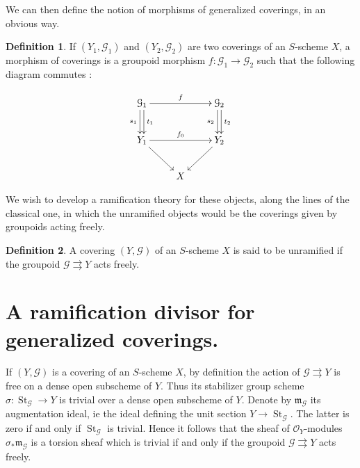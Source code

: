\documentclass{amsart}
\theoremstyle{definition}
\newtheorem{defi}{Definition}[section]
\theoremstyle{remark}
\begin{document}
We can then define the notion of morphisms of generalized coverings, in an obvious way.

\begin{defi}

If $(Y_1,{{\mathcal G}}_1)$ and $(Y_2,{{\mathcal G}}_2)$ are two coverings of an $S$-scheme $X$, a morphism of coverings is a groupoid morphism $f : {{\mathcal G}}_1 {\longrightarrow} {{\mathcal G}}_2$ such that the following diagram commutes : 

 \[ \xymatrix{ {{\mathcal G}}_1 \ar[rr]^{f} \ar@<-2pt>_{s_1}[d] \ar@<2pt>^{t_1}[d] & & {{\mathcal G}}_2 \ar@<-2pt>_{s_2}[d] \ar@<2pt>^{t_2}[d] \\  Y_1 \ar[rr]^{f_0} \ar[rd] & & Y_2 \ar[ld] \\ &  X  } \]

\end{defi}

We wish to develop a ramification theory for these objects, along the lines of the classical one, in which the unramified objects would be the coverings given by groupoids acting freely. 

\begin{defi}

A covering $(Y,{{\mathcal G}})$ of an $S$-scheme $X$ is said to be unramified if the groupoid ${{\mathcal G}} {\rightrightarrows} Y$ acts freely. 

\end{defi}

\section{A ramification divisor for generalized coverings.}

If $(Y,{{\mathcal G}})$ is a covering of an $S$-scheme $X$, by definition the action of ${{\mathcal G}} {\rightrightarrows} Y$ is free on a dense open subscheme of $Y$. Thus its stabilizer group scheme $\sigma : \operatorname{St}_{{\mathcal G}} {\longrightarrow} Y$ is trivial over a dense open subscheme of $Y$. Denote by ${{\mathfrak m}}_{{\mathcal G}}$ its augmentation ideal, ie the ideal defining the unit section $Y {\longrightarrow} \operatorname{St}_{{\mathcal G}}$. The latter is zero if and only if $\operatorname{St}_{{\mathcal G}}$ is trivial. Hence it follows that the sheaf of ${{\mathcal O}}_Y$-modules $\sigma_*{{\mathfrak m}}_{{\mathcal G}}$ is a torsion sheaf which is trivial if and only if the groupoid ${{\mathcal G}} {\rightrightarrows} Y$ acts freely.  
\end{document}
